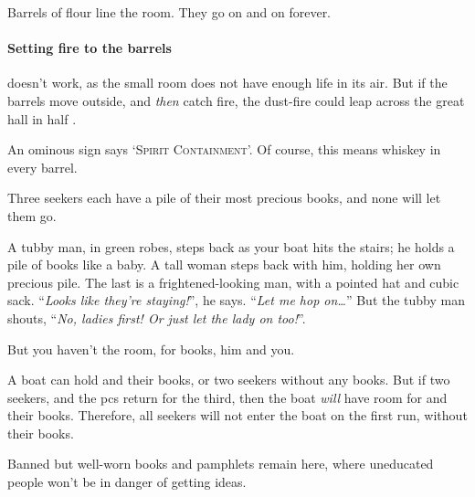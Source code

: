 \begin{multicols}{2}

Barrels of flour line the room.
They go on and on forever.

\paragraph{Setting fire to the barrels}
doesn't work, as the small room does not have enough life in its air.
But if the barrels move outside, and \emph{then} catch fire, the dust-fire could leap across the great hall in half .


An ominous sign says `\textsc{Spirit Containment}'.
Of course, this means whiskey in every barrel.



Three \glspl{seeker} each have a pile of their most precious books, and none will let them go.

\begin{boxtext}
  A tubby man, in green robes, steps back as your boat hits the stairs; he holds a pile of books like a baby.
  A tall woman steps back with him, holding her own precious pile.
  The last is a frightened-looking man, with a pointed hat and cubic sack.
  ``\textit{Looks like they're staying!}'', he says.
  ``\textit{Let me hop on\ldots}''
  But the tubby man shouts, ``\textit{No, ladies first!
  Or just let the lady on too!}''.

  But you haven't the room, for books, him and you.
\end{boxtext}

A boat can hold  and their books, or two \glspl{seeker} without any books.
But if two \glspl{seeker}, and the \glspl{pc} return for the third, then the boat \emph{will} have room for  and their books.
Therefore, all \glspl{seeker} will not enter the boat on the first run, without their books.





Banned but well-worn books and pamphlets remain here, where uneducated people won't be in danger of getting ideas.


\end{multicols}
